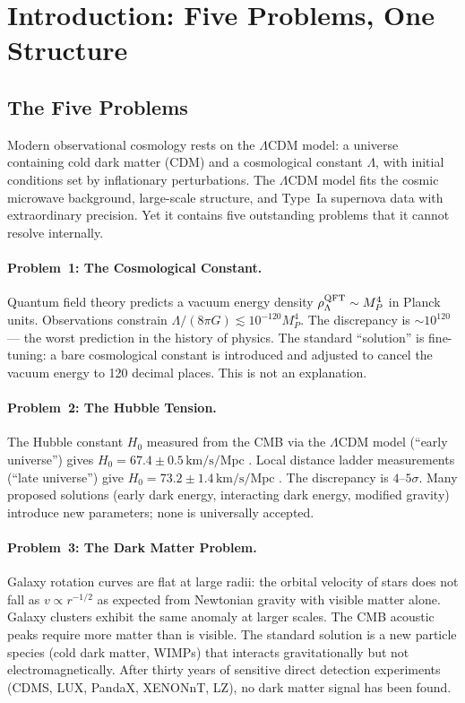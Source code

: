 \documentclass[12pt,a4paper]{article}
\begin{document}
\section{Introduction: Five Problems, One Structure}\label{sec:intro}

\subsection{The Five Problems}

Modern observational cosmology rests on the $\Lambda$CDM model: a universe containing cold dark matter (CDM) and a cosmological constant $\Lambda$, with initial conditions set by inflationary perturbations.  The $\Lambda$CDM model fits the cosmic microwave background, large-scale structure, and Type~Ia supernova data with extraordinary precision.  Yet it contains five outstanding problems that it cannot resolve internally.

\paragraph{Problem~1: The Cosmological Constant.}
Quantum field theory predicts a vacuum energy density $\rho_\Lambda^{\rm QFT}\sim M_P^4$ in Planck units.  Observations constrain $\Lambda/(8\pi G)\lesssim10^{-120}M_P^4$.  The discrepancy is $\sim10^{120}$ --- the worst prediction in the history of physics.  The standard ``solution'' is fine-tuning: a bare cosmological constant is introduced and adjusted to cancel the vacuum energy to 120 decimal places.  This is not an explanation.

\paragraph{Problem~2: The Hubble Tension.}
The Hubble constant $H_0$ measured from the CMB via the $\Lambda$CDM model (``early universe'') gives $H_0=67.4\pm0.5\,\mathrm{km/s/Mpc}$ \cite{Planck2020}.  Local distance ladder measurements (``late universe'') give $H_0=73.2\pm1.4\,\mathrm{km/s/Mpc}$ \cite{Riess2022}.  The discrepancy is $4$--$5\sigma$.  Many proposed solutions (early dark energy, interacting dark energy, modified gravity) introduce new parameters; none is universally accepted.

\paragraph{Problem~3: The Dark Matter Problem.}
Galaxy rotation curves are flat at large radii: the orbital velocity of stars does not fall as $v\propto r^{-1/2}$ as expected from Newtonian gravity with visible matter alone.  Galaxy clusters exhibit the same anomaly at larger scales.  The CMB acoustic peaks require more matter than is visible.  The standard solution is a new particle species (cold dark matter, WIMPs) that interacts gravitationally but not electromagnetically.  After thirty years of sensitive direct detection experiments (CDMS, LUX, PandaX, XENONnT, LZ), no dark matter signal has been found.
\end{document}

